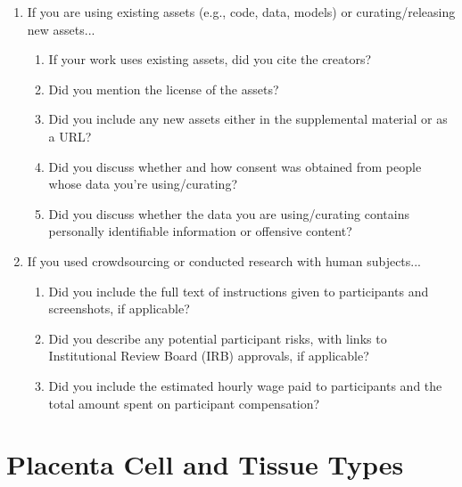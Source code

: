 \documentclass{article}
\begin{document}
\begin{enumerate}
\item If you are using existing assets (e.g., code, data, models) or curating/releasing new assets...
\begin{enumerate}
  \item If your work uses existing assets, did you cite the creators?
  \item Did you mention the license of the assets?
  \item Did you include any new assets either in the supplemental material or as a URL?
  \item Did you discuss whether and how consent was obtained from people whose data you're using/curating?
  \item Did you discuss whether the data you are using/curating contains personally identifiable information or offensive content?
\end{enumerate}


\item If you used crowdsourcing or conducted research with human subjects...
\begin{enumerate}
  \item Did you include the full text of instructions given to participants and screenshots, if applicable?
    \answerNA{}
  \item Did you describe any potential participant risks, with links to Institutional Review Board (IRB) approvals, if applicable?
    \answerNA{}
  \item Did you include the estimated hourly wage paid to participants and the total amount spent on participant compensation?
    \answerNA{}
\end{enumerate}


\end{enumerate}





\pagebreak
\appendix

\section{Placenta Cell and Tissue Types}
\label{cell-tissue-types}
\end{document}
